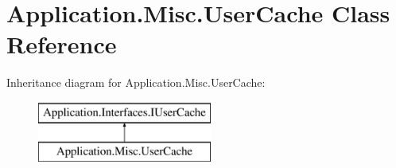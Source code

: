 \hypertarget{class_application_1_1_misc_1_1_user_cache}{}\section{Application.\+Misc.\+User\+Cache Class Reference}
\label{class_application_1_1_misc_1_1_user_cache}
Inheritance diagram for Application.\+Misc.\+User\+Cache\+:\begin{figure}[H]
\begin{center}
\leavevmode
\includegraphics[height=2.000000cm]{class_application_1_1_misc_1_1_user_cache}
\end{center}
\end{figure}
